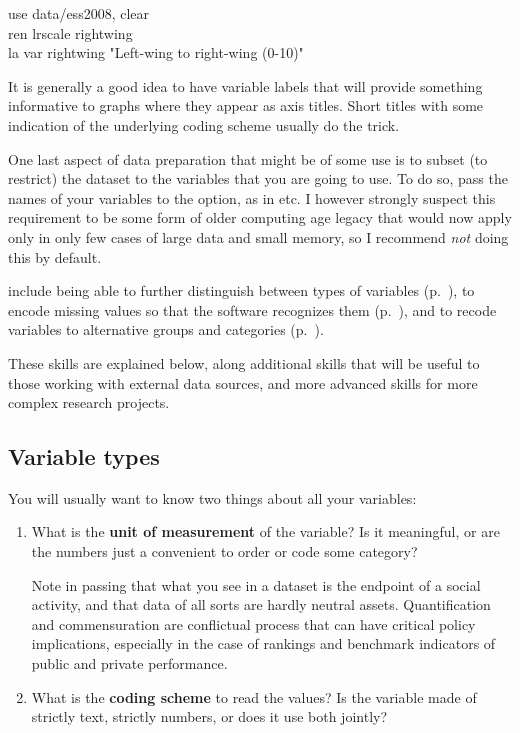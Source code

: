 	\begin{docspec}
		use data/ess2008, clear\\
		ren lrscale rightwing\\
		la var rightwing "Left-wing to right-wing (0-10)"
	\end{docspec}

It is generally a good idea to have variable labels that will provide something informative to graphs where they appear as axis titles. Short titles with some indication of the underlying coding scheme usually do the trick.

One last aspect of data preparation that might be of some use is to subset (\ie to restrict) the dataset to the variables that you are going to use. To do so, pass the names of your variables to the  option, as in  etc. I however strongly suspect this requirement to be some form of older computing age legacy that would now apply only in only few cases of large data and small memory, so I recommend \emph{not} doing this by default.

 include being able to further distinguish between types of variables (p.~\pageref{sec:variable-types}), to encode missing values so that the software recognizes them (p.~\pageref{sec:missing-values}), and to recode variables to alternative groups and categories (p.~\pageref{sec:categorical-recodes}).

These skills are explained below, along additional skills that will be useful to those working with external data sources, and more advanced skills for more complex research projects.%

%
%
\subsection{Variable types}
\label{sec:variable-types}

You will usually want to know two things about all your variables:

\begin{enumerate}
	\item What is the \textbf{unit of measurement} of the variable? Is it meaningful, or are the numbers just a convenient to order or code some category?
	
Note in passing that what you see in a dataset is the endpoint of a social activity, and that data of all sorts are hardly neutral assets. Quantification and commensuration are conflictual process that can have critical policy implications, especially in the case of rankings and benchmark indicators of public and private performance.%

	\item What is the \textbf{coding scheme} to read the values? Is the variable made of strictly text, strictly numbers, or does it use both jointly?
\end{enumerate}

